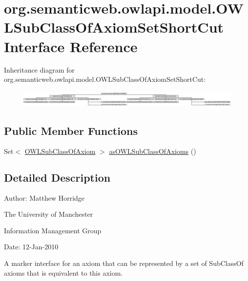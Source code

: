 \hypertarget{interfaceorg_1_1semanticweb_1_1owlapi_1_1model_1_1_o_w_l_sub_class_of_axiom_set_short_cut}{\section{org.\-semanticweb.\-owlapi.\-model.\-O\-W\-L\-Sub\-Class\-Of\-Axiom\-Set\-Short\-Cut Interface Reference}
\label{interfaceorg_1_1semanticweb_1_1owlapi_1_1model_1_1_o_w_l_sub_class_of_axiom_set_short_cut}
}
Inheritance diagram for org.\-semanticweb.\-owlapi.\-model.\-O\-W\-L\-Sub\-Class\-Of\-Axiom\-Set\-Short\-Cut\-:\begin{figure}[H]
\begin{center}
\leavevmode
\includegraphics[height=0.881612cm]{interfaceorg_1_1semanticweb_1_1owlapi_1_1model_1_1_o_w_l_sub_class_of_axiom_set_short_cut}
\end{center}
\end{figure}
\subsection*{Public Member Functions}
\begin{DoxyCompactItemize}
\item 
Set$<$ \hyperlink{interfaceorg_1_1semanticweb_1_1owlapi_1_1model_1_1_o_w_l_sub_class_of_axiom}{O\-W\-L\-Sub\-Class\-Of\-Axiom} $>$ \hyperlink{interfaceorg_1_1semanticweb_1_1owlapi_1_1model_1_1_o_w_l_sub_class_of_axiom_set_short_cut_ab706efcec77b528cb56c498d82fd798a}{as\-O\-W\-L\-Sub\-Class\-Of\-Axioms} ()
\end{DoxyCompactItemize}


\subsection{Detailed Description}
Author\-: Matthew Horridge\par
 The University of Manchester\par
 Information Management Group\par
 Date\-: 12-\/\-Jan-\/2010 

A marker interface for an axiom that can be represented by a set of Sub\-Class\-Of axioms that is equivalent to this axiom. 

